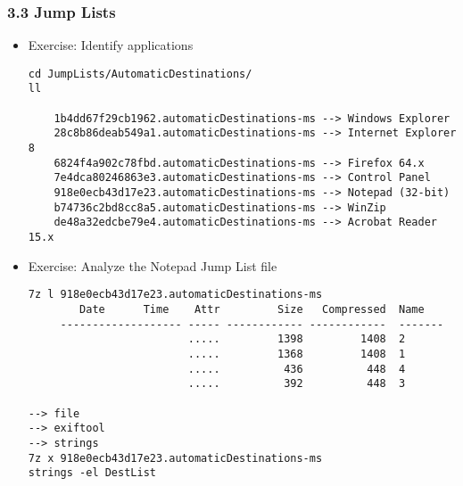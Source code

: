 \begin{frame}[fragile]
  \frametitle{3.3 Jump Lists}
    \begin{itemize}
        \item Exercise: Identify applications
  \begin{lstlisting}[basicstyle=\tiny]
cd JumpLists/AutomaticDestinations/
ll

    1b4dd67f29cb1962.automaticDestinations-ms --> Windows Explorer
    28c8b86deab549a1.automaticDestinations-ms --> Internet Explorer 8
    6824f4a902c78fbd.automaticDestinations-ms --> Firefox 64.x
    7e4dca80246863e3.automaticDestinations-ms --> Control Panel
    918e0ecb43d17e23.automaticDestinations-ms --> Notepad (32-bit)
    b74736c2bd8cc8a5.automaticDestinations-ms --> WinZip
    de48a32edcbe79e4.automaticDestinations-ms --> Acrobat Reader 15.x
  \end{lstlisting}
	\item Exercise: Analyze the Notepad Jump List file
  \begin{lstlisting}[basicstyle=\tiny]
7z l 918e0ecb43d17e23.automaticDestinations-ms
        Date      Time    Attr         Size   Compressed  Name
     ------------------- ----- ------------ ------------  -------
                         .....         1398         1408  2
                         .....         1368         1408  1
                         .....          436          448  4
                         .....          392          448  3

--> file
--> exiftool
--> strings 
7z x 918e0ecb43d17e23.automaticDestinations-ms
strings -el DestList
  \end{lstlisting}
    \end{itemize}
\end{frame}


